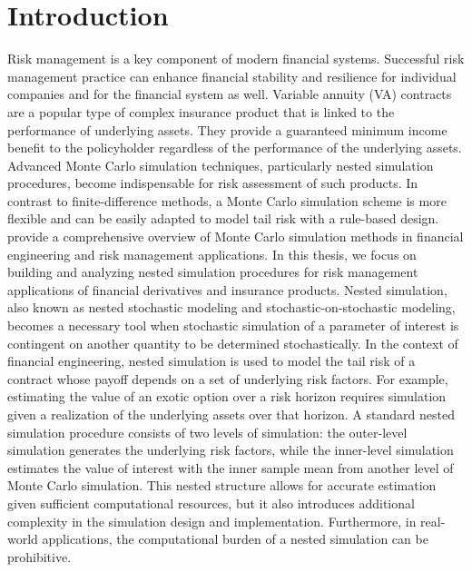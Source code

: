 \chapter{Introduction}

Risk management is a key component of modern financial systems.
Successful risk management practice can enhance financial stability and resilience for individual companies and for the financial system as well.
Variable annuity (VA) contracts are a popular type of complex insurance product that is linked to the performance of underlying assets.
They provide a guaranteed minimum income benefit to the policyholder regardless of the performance of the underlying assets.
Advanced Monte Carlo simulation techniques, particularly nested simulation procedures, become indispensable for risk assessment of such products.
In contrast to finite-difference methods, a Monte Carlo simulation scheme is more flexible and can be easily adapted to model tail risk with a rule-based design.
~\cite{glasserman2004monte} provide a comprehensive overview of Monte Carlo simulation methods in financial engineering and risk management applications.
In this thesis, we focus on building and analyzing nested simulation procedures for risk management applications of financial derivatives and insurance products.
Nested simulation, also known as nested stochastic modeling and stochastic-on-stochastic modeling, becomes a necessary tool when stochastic simulation of a parameter of interest is contingent on another quantity to be determined stochastically.
In the context of financial engineering, nested simulation is used to model the tail risk of a contract whose payoff depends on a set of underlying risk factors.
For example, estimating the value of an exotic option over a risk horizon requires simulation given a realization of the underlying assets over that horizon.
A standard nested simulation procedure consists of two levels of simulation: the outer-level simulation generates the underlying risk factors, while the inner-level simulation estimates the value of interest with the inner sample mean from another level of Monte Carlo simulation.
This nested structure allows for accurate estimation given sufficient computational resources, but it also introduces additional complexity in the simulation design and implementation.
Furthermore, in real-world applications, the computational burden of a nested simulation can be prohibitive.
